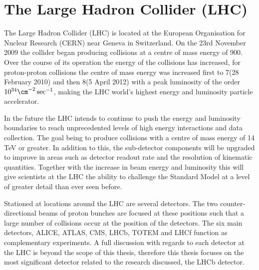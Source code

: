 \section{The Large Hadron Collider (LHC)}

The Large Hadron Collider (LHC) is located at the European Organisation for Nuclear Research (CERN) near Geneva in Switzerland. On the 23rd November 2009 the collider began producing collisions at a centre of mass energy of 900\gev. Over the course of its operation the energy of the collisions has increased, for proton-proton collisions the centre of mass energy was increased first to 7\TeV (28 February 2010) and then 8\TeV (5 April 2012) with a peak luminosity of the order $10^{34}\cm^{-2}\sec^{-1}$, making the LHC world's highest energy and luminosity particle accelerator. 


In the future the LHC intends to continue to push the energy and luminosity boundaries to reach unprecedented levels of high energy interactions and data collection. The goal being to produce collisions with a centre of mass energy of 14 TeV or greater. In addition to this, the sub-detector components will be upgraded to improve in areas such as detector readout rate and the resolution of kinematic quantities. Together with the increase in beam energy and luminosity this will give scientists at the LHC the ability to challenge the Standard Model at a level of greater detail than ever seen before.

Stationed at locations around the LHC are several detectors. The two counter-directional beams of proton bunches are focused at these positions such that a large number of collisions occur at the position of the detectors. The six main detectors, ALICE\cite{Aamodt:1129812}, ATLAS\cite{Aad:1129811}, CMS\cite{Chatrchyan:1129810}, LHCb\cite{Alves:1129809}, TOTEM\cite{Anelli:1129807} and LHCf\cite{Adriani:1129808} function as complementary experiments. A full discussion with regards to each detector at the LHC is beyond the scope of this thesis, therefore this thesis focuses on the most significant detector related to the research discussed, the LHCb detector.

